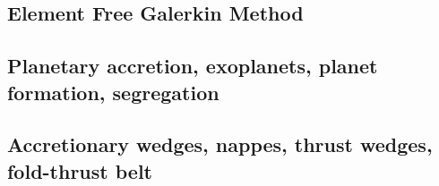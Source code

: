 \subsection{Element Free Galerkin Method}

{\scriptsize
\noindent
\cite{begl94b}
\cite{belg95a}
\cite{belg95b}
\cite{bekf96}\cite{como96}
\cite{bekk97}
\cite{pobe98}
}

\subsection{Planetary accretion, exoplanets, planet formation, segregation}

{\scriptsize
\noindent
\cite{lejm08}
\cite{ligt09}\cite{gogk09}
\cite{vayb10}
\cite{ligt11}\cite{vacg11}
\cite{vagc13}
\cite{gobg14}\cite{yadl14}
\cite{neum19}\cite{vayu19}
}

\subsection{Accretionary wedges, nappes, thrust wedges, fold-thrust belt} 

{\scriptsize
\noindent
\cite{stoc83}\cite{dasd83}
\cite{dahl84}\cite{dasd84}
\cite{dahl90}
\cite{koon94}
\cite{wiep03}\cite{smbs03}
\cite{simp06}
\cite{rugb13}
\cite{mauw16}
\cite{mauw17}\cite{rugb17}
\cite{elgb19}
}

